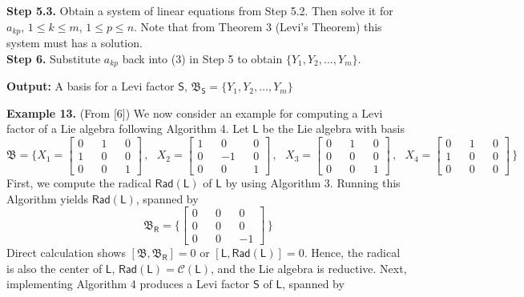 \documentclass[11pt,a4paper]{article}
\begin{document}
\begin{algorithm}
\begin{algorithmic}
\State \qquad \quad \textbf{Step 5.3.} Obtain a system of linear equations from Step 5.2. Then solve it for $a_{kp}$, $1 \leq k \leq m$, $1 \leq p \leq n$. Note that from Theorem 3 (Levi's Theorem) this system must has a solution. \\

\State \quad \textbf{Step 6.} Substitute $a_{kp}$ back into (3) in Step 5 to obtain $\{Y_1, Y_2, \dots, Y_m \}$.

\State \textbf{Output:} A basis for a Levi factor $\mathsf{S}$, $\mathfrak{B}_{\mathsf{S}} = \{Y_1, Y_2, \dots, Y_m \}$
\end{algorithmic}
\end{algorithm}


\textbf{Example 13.} (From [6]) We now consider an example for computing a Levi factor of a Lie algebra following Algorithm 4. Let $\mathsf{L}$ be the Lie algebra with basis 
$$
\mathfrak{B} = \{ 
X_1 = \left[
	   \begin{aligned}
		 0 &&  1 && 0  \\
	 	 1 &&  0 && 0  \\
	 	 0 &&  0 && 1
	   \end{aligned}
	  \right]\,, \text{ }
X_2 = \left[
	   \begin{aligned}
		 1 &&  0 && 0  \\
	 	 0 && -1 && 0  \\
	 	 0 &&  0 && 1
	   \end{aligned}
	  \right]\,, \text{ }
X_3 = \left[
	   \begin{aligned}
		 0 &&  1 && 0  \\
	 	 0 &&  0 && 0  \\
	 	 0 &&  0 && 1
	   \end{aligned}
	  \right]\,,
\text{ }
X_4 = \left[
	   \begin{aligned}
		 0 &&  1 && 0  \\
	 	 1 &&  0 && 0  \\
	 	 0 &&  0 && 0
	   \end{aligned}
	  \right]\,
\}	
$$
First, we compute the radical $\mathsf{Rad}(\mathsf{L})$ of $\mathsf{L}$ by using Algorithm 3. Running this Algorithm yields  
$\mathsf{Rad}(\mathsf{L})$, spanned by
$$ \mathfrak{B}_{\mathsf{R}} =
\{
	 \left[
	   \begin{aligned}
		 0 &&  0 && 0  \\
	 	 0 &&  0 && 0  \\
	 	 0 &&  0 && -1
	   \end{aligned}
	  \right]\,
\}$$
Direct calculation shows $[\mathfrak{B},\mathfrak{B}_{\mathsf{R}}] = 0$ or $[\mathsf{L},\mathsf{Rad}(\mathsf{L})] = 0$. Hence, the radical is also the center of $\mathsf{L}$, $\mathsf{Rad}(\mathsf{L}) = \mathcal{C}(\mathsf{L})$, and the Lie algebra is reductive. Next, implementing Algorithm 4 produces a Levi factor $\mathsf{S}$ of $\mathsf{L}$, spanned by
\end{document}
